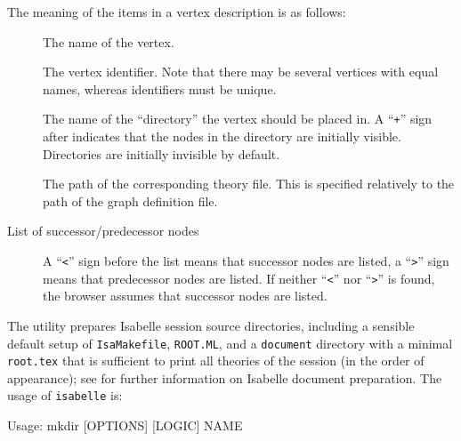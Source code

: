\begin{isabellebody}
\begin{isamarkuptext}
  The meaning of the items in a vertex description is as follows:

  \begin{description}
  
  \item[] The name of the vertex.
  
  \item[] The vertex identifier. Note that there may
  be several vertices with equal names, whereas identifiers must be
  unique.
  
  \item[] The name of the ``directory'' the vertex
  should be placed in.  A ``\verb|+|'' sign after  indicates that the nodes in the directory are initially
  visible. Directories are initially invisible by default.
  
  \item[] The path of the corresponding theory file. This
  is specified relatively to the path of the graph definition file.
  
  \item[List of successor/predecessor nodes] A ``\verb|<|''
  sign before the list means that successor nodes are listed, a
  ``\verb|>|'' sign means that predecessor nodes are listed. If
  neither ``\verb|<|'' nor ``\verb|>|'' is found, the
  browser assumes that successor nodes are listed.

  \end{description}%
\end{isamarkuptext}%
\isamarkuptrue%
%
\isamarkuptrue%
%
\begin{isamarkuptext}%
The \hypertarget{tool.mkdir}{\hyperlink{tool.mkdir}{\mbox{}}} utility prepares Isabelle session source
  directories, including a sensible default setup of \verb|IsaMakefile|, \verb|ROOT.ML|, and a \verb|document|
  directory with a minimal \verb|root.tex| that is sufficient to
  print all theories of the session (in the order of appearance); see
   for further information on Isabelle
  document preparation.  The usage of \verb|isabelle| \hyperlink{tool.mkdir}{\mbox{}} is:

\begin{ttbox}
Usage: mkdir [OPTIONS] [LOGIC] NAME


\end{ttbox}
\end{isamarkuptext}
\end{isabellebody}
